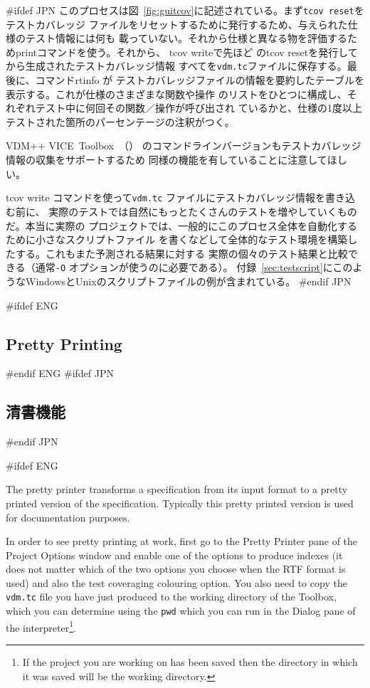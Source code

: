 \documentclass[\pformat,12pt]{article}
\newcommand{\vdmslpp}{VDM-SL}
\newcommand{\Toolbox}{Toolbox}
\newcommand{\vdmslpp}{VDM++}
\newcommand{\Toolbox}{Toolbox}
\renewcommand{\vdmslpp}{VDM++ VICE}
\newcommand{\guicmd}[1]{{\sf #1}}
\newcommand{\guicmd}[1]{{\gt #1}}
\begin{document}
#ifdef JPN
このプロセスは図~\ref{fig:guitcov}に記述されている。まず{\tt tcov reset}をテストカバレッジ
ファイルをリセットするために発行するため、与えられた仕様のテスト情報には何も
載っていない。それから仕様と異なる物を評価するため\guicmd{print}コマンドを使う。それから、
\guicmd{tcov write}で先ほど
の\guicmd{tcov reset}を発行してから生成されたテストカバレッジ情報
すべてを\texttt{vdm.tc}ファイルに保存する。最後に、コマンド\guicmd{rtinfo} が
テストカバレッジファイルの情報を要約したテーブルを表示する。これが仕様のさまざまな関数や操作
のリストをひとつに構成し、それぞれテスト中に何回その関数／操作が呼び出され
ているかと、仕様の1度以上テストされた箇所のパーセンテージの注釈がつく。

\vdmslpp\ \Toolbox\ （）
のコマンドラインバージョンもテストカバレッジ情報の収集をサポートするため
同様の機能を有していることに注意してほしい。

\guicmd{tcov write} コマンドを使って\texttt{vdm.tc} ファイルにテストカバレッジ情報を書き込む前に、
実際のテストでは自然にもっとたくさんのテストを増やしていくものだ。本当に実際の
プロジェクトでは、一般的にこのプロセス全体を自動化するために小さなスクリプトファイル
を書くなどして全体的なテスト環境を構築したする。これもまた予測される結果に対する
実際の個々のテスト結果と比較できる（通常{\tt -O} オプションが使うのに必要である）。
付録~\ref{sec:testscript}にこのようなWindowsとUnixのスクリプトファイルの例が含まれている。
#endif JPN

#ifdef ENG
\subsection{Pretty Printing}\label{subsec:pp}
#endif ENG
#ifdef JPN
\subsection{清書機能}\label{subsec:pp}
#endif JPN

#ifdef ENG

The pretty printer transforms a specification from its input format to
a pretty printed version of the specification. Typically this pretty
printed version is used for documentation purposes.

In order to see pretty printing at work, first go to the \guicmd{Pretty
Printer} pane of the \guicmd{Project Options} window and enable one of the
options to produce indexes (it does not matter which of the 
two options you choose when the RTF format is used) and also the test
coveraging colouring option. You also need to copy the {\tt vdm.tc}
file you have just produced to the working directory of the
\Toolbox, which you can determine using the {\tt pwd}
which you can run in the \guicmd{Dialog} pane of the
interpreter\footnote{If the project you are working on has been saved
  then the directory in which it was saved will be the working
  directory.}.
\end{document}
